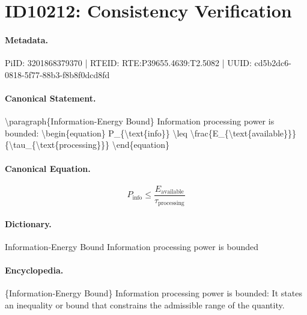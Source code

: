 \section*{ID10212: Consistency Verification}
\paragraph{Metadata.}
PiID: 3201868379370 | RTEID: RTE:P39655.4639:T2.5082 | UUID: cd5b2dc6-0818-5f77-88b3-f8b8f0dcd8fd

\paragraph{Canonical Statement.}
\textbackslash{}paragraph\{Information-Energy Bound\} Information processing power is bounded: \textbackslash{}begin\{equation\} P\_\{\textbackslash{}text\{info\}\} \textbackslash{}leq \textbackslash{}frac\{E\_\{\textbackslash{}text\{available\}\}\}\{\textbackslash{}tau\_\{\textbackslash{}text\{processing\}\}\} \textbackslash{}end\{equation\}

\paragraph{Canonical Equation.}
\[
P_{\text{info}} \leq \frac{E_{\text{available}}}{\tau_{\text{processing}}}
\]

\paragraph{Dictionary.}
Information-Energy Bound Information processing power is bounded

\paragraph{Encyclopedia.}
\{Information-Energy Bound\} Information processing power is bounded: It states an inequality or bound that constrains the admissible range of the quantity.
